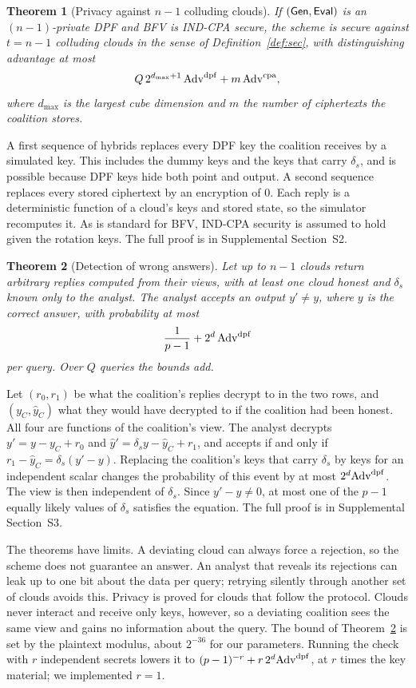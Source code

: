 \documentclass[10pt,journal,compsoc]{IEEEtran}
\newtheorem{theorem}{Theorem}
\begin{document}
\begin{theorem}[Privacy against $n-1$ colluding clouds]
\label{thm:sec}
If $(\mathsf{Gen},\mathsf{Eval})$ is an $(n{-}1)$-private DPF and BFV is IND-CPA secure, the
scheme is secure against $t=n-1$ colluding clouds in the sense of
Definition~\ref{def:sec}, with distinguishing advantage at most
\[
Q\,2^{d_{\max}+1}\,\mathrm{Adv}^{\mathrm{dpf}}+m\,\mathrm{Adv}^{\mathrm{cpa}} ,
\]
where $d_{\max}$ is the largest cube dimension and $m$ the number of
ciphertexts the coalition stores.
\end{theorem}
\begin{IEEEproof}
A first sequence of hybrids replaces every DPF key the coalition receives by a
simulated key. This includes the dummy keys and the keys that carry
$\delta_s$, and is possible because DPF keys hide both point and output. A
second sequence replaces every stored ciphertext by an encryption of $0$. Each
reply is a deterministic function of a cloud's keys and stored state, so the
simulator recomputes it. As is standard for BFV, IND-CPA security is assumed to
hold given the rotation keys. The full proof is in Supplemental Section~S2.
\end{IEEEproof}

\begin{theorem}[Detection of wrong answers]
\label{thm:tamper}
Let up to $n-1$ clouds return arbitrary replies computed from their views,
with at least one cloud honest and $\delta_s$ known only to the analyst. The
analyst accepts an output $y'\neq y$, where $y$ is the correct answer, with
probability at most
\[
\frac{1}{p-1}+2^d\,\mathrm{Adv}^{\mathrm{dpf}}
\]
per query. Over $Q$ queries the bounds add.
\end{theorem}
\begin{IEEEproof}
Let $(r_0,r_1)$ be what the coalition's replies decrypt to in the two rows,
and $(y_C,\hat y_C)$ what they would have decrypted to if the coalition had
been honest. All four are functions of the coalition's view. The analyst
decrypts $y'=y-y_C+r_0$ and $\hat y'=\delta_sy-\hat y_C+r_1$, and accepts if
and only if $r_1-\hat y_C=\delta_s(y'-y)$. Replacing the coalition's keys that
carry $\delta_s$ by keys for an independent scalar changes the probability of
this event by at most $2^d\mathrm{Adv}^{\mathrm{dpf}}$. The view is then independent of
$\delta_s$. Since $y'-y\neq0$, at most one of the $p-1$ equally likely values
of $\delta_s$ satisfies the equation. The full proof is in Supplemental
Section~S3.
\end{IEEEproof}

The theorems have limits. A deviating cloud can always force a rejection, so
the scheme does not guarantee an answer. An analyst that reveals its
rejections can leak up to one bit about the data per query; retrying silently
through another set of clouds avoids this. Privacy is proved for clouds that
follow the protocol. Clouds never interact and receive only keys, however, so
a deviating coalition sees the same view and gains no information about the
query. The bound of Theorem~\ref{thm:tamper} is set by the plaintext modulus,
about $2^{-36}$ for our parameters. Running the check with $r$ independent
secrets lowers it to $(p-1)^{-r}+r\,2^d\mathrm{Adv}^{\mathrm{dpf}}$, at $r$ times the key
material; we implemented $r=1$.
\end{document}

